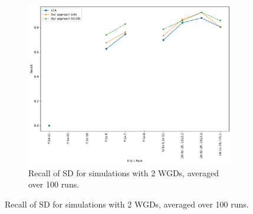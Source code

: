 \documentclass[10pt]{article}
\begin{document}
\begin{figure}[h!]
\begin{subfigure}[b]{0.48\textwidth}
        \includegraphics[width=\textwidth]{figs/recall-2W-sd-t20-t80-Avg.pdf}
        \caption{Recall of SD for simulations with 2 WGDs, averaged over 100 runs.}
        \label{fig:recall-sd-2wgd}
    \end{subfigure}
    

\end{figure}
\end{document}
